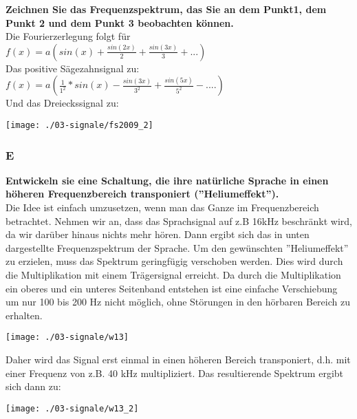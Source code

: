 \textbf{Zeichnen Sie das Frequenzspektrum, das Sie an dem Punkt1, dem Punkt 2 und dem Punkt 3 beobachten können.}\\
Die Fourierzerlegung folgt für\\
$f(x)=a(sin(x)+\frac{sin(2x)}{2}+\frac{sin(3x)}{3}+...)$\\

Das positive Sägezahnsignal zu:\\
$f(x)=a(\frac{1}{1^2}*sin(x)-\frac{sin(3x)}{3^2}+\frac{sin(5x)}{5^2}-....)$\\

Und das Dreieckssignal zu:
\begin{center}
    \vspace{-8pt}
    \texttt{[image: ./03-signale/fs2009\_2]}
    \vspace{-8pt}
\end{center}

\subsubsection{E}
\textbf{Entwickeln sie eine Schaltung, die ihre natürliche Sprache in einen höheren Frequenzbereich transponiert (”Heliumeffekt”).}\\
Die Idee ist einfach umzusetzen, wenn man das Ganze im Frequenzbereich betrachtet. Nehmen wir an, dass das Sprachsignal auf z.B 16kHz beschränkt wird, da wir darüber hinaus nichts mehr hören. 
Dann ergibt sich das in unten dargestellte Frequenzspektrum der Sprache. Um den gewünschten ''Heliumeffekt'' zu erzielen, muss das Spektrum geringfügig verschoben werden. 
Dies wird durch die Multiplikation mit einem Trägersignal erreicht. Da durch die Multiplikation ein oberes und ein unteres Seitenband entstehen ist eine einfache Verschiebung um nur 100
bis 200 Hz nicht möglich, ohne Störungen in den hörbaren Bereich zu erhalten.\\
\begin{center}
    \vspace{-8pt}
    \texttt{[image: ./03-signale/w13]}
    \vspace{-8pt}
\end{center}

Daher wird das Signal erst einmal in einen höheren Bereich transponiert, d.h. mit einer Frequenz von z.B. 40 kHz multipliziert. 
Das resultierende Spektrum ergibt sich dann zu:
\begin{center}
    \vspace{-8pt}
    \texttt{[image: ./03-signale/w13\_2]}
    \vspace{-8pt}
\end{center}

